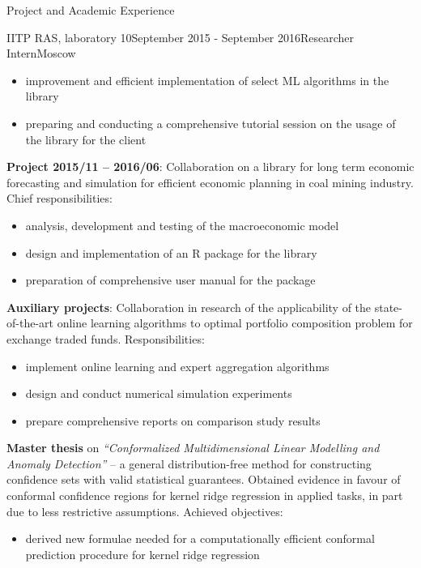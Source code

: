 \documentclass{resume} %
\begin{document}
\begin{rSection}{Project and Academic Experience}
\begin{rSubsection}{IITP RAS, laboratory 10}{September 2015 - September 2016}{Researcher Intern}{Moscow}
\begin{itemize}
        \item improvement and efficient implementation of select ML algorithms in
        the library

        \item preparing and conducting a comprehensive tutorial session on the usage
        of the library for the client
    \end{itemize}

    \medskip
    \item \textbf{Project 2015/11 -- 2016/06}: Collaboration on a library for long
    term economic forecasting and simulation for efficient economic planning in coal
    mining industry.
    Chief responsibilities: \begin{itemize}
        \item analysis, development and testing of the macroeconomic model

        \item design and implementation of an R package for the library

        \item preparation of comprehensive user manual for the package
    \end{itemize}

    \medskip
    \item \textbf{Auxiliary projects}: Collaboration in research of the applicability
    of the state-of-the-art online learning algorithms to optimal portfolio composition
    problem for exchange traded funds. Responsibilities: \begin{itemize}
        \item implement online learning and expert aggregation algorithms

        \item design and conduct numerical simulation experiments

        \item prepare comprehensive reports on comparison study results
    \end{itemize}

    \medskip
    \item \textbf{Master thesis} on \textit{``Conformalized Multidimensional Linear
    Modelling and Anomaly Detection''} -- a general distribution-free method for
    constructing confidence sets with valid statistical guarantees. Obtained evidence
    in favour of conformal confidence regions for kernel ridge regression in applied
    tasks, in part due to less restrictive assumptions.
    Achieved objectives: \begin{itemize}
        \item derived new formulae needed for a computationally efficient conformal
        prediction procedure for kernel ridge regression


\end{itemize}
\end{rSubsection}
\end{rSection}
\end{document}
